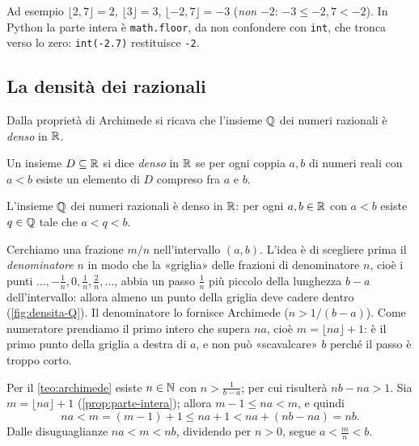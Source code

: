 Ad esempio $\lfloor 2{,}7\rfloor=2$, $\lfloor 3\rfloor=3$, $\lfloor-2{,}7\rfloor=-3$
(\emph{non} $-2$: $-3\le-2{,}7<-2$). In Python la parte intera è
\texttt{math.floor}, da non confondere con \texttt{int}, che tronca verso lo zero:
\texttt{int(-2.7)} restituisce \texttt{-2}.

\subsection{La densità dei razionali}

Dalla proprietà di Archimede si ricava che l'insieme $\mathbb{Q}$ dei numeri razionali è
\emph{denso} in $\mathbb{R}$.

\begin{definizione}
Un insieme $D\subseteq\mathbb{R}$ si dice \emph{denso} in $\mathbb{R}$ se per ogni coppia $a,b$ di numeri
reali con $a<b$ esiste un elemento di $D$ compreso fra $a$ e $b$.
\end{definizione}

\begin{teorema}\label{teo:densita-Q}
L'insieme $\mathbb{Q}$ dei numeri razionali è denso in $\mathbb{R}$: per ogni $a,b\in\mathbb{R}$ con $a<b$
esiste $q\in\mathbb{Q}$ tale che $a<q<b$.
\end{teorema}

\begin{schema}
\end{schema}

\begin{strategia}
Cerchiamo una frazione $m/n$ nell'intervallo $(a,b)$. L'idea è di scegliere prima il
\emph{denominatore} $n$ in modo che la «griglia» delle frazioni di denominatore $n$,
cioè i punti $\dots,-\frac1n,0,\frac1n,\frac2n,\dots$, abbia un passo $\frac1n$ più
piccolo della lunghezza $b-a$ dell'intervallo: allora almeno un punto della griglia deve
cadere dentro (\cref{fig:densita-Q}). Il denominatore lo fornisce Archimede ($n>1/(b-a)$).
Come numeratore prendiamo il primo intero che supera $na$, cioè $m=\lfloor na\rfloor+1$:
è il primo punto della griglia a destra di $a$, e non può «scavalcare» $b$ perché il passo
è troppo corto.
\end{strategia}

\begin{dimostrazione}
Per il \cref{teo:archimede} esiste $n\in\mathbb{N}$ con $n>\frac{1}{b-a}$; per cui risulterà
$nb-na>1$. Sia $m=\lfloor na\rfloor+1$ (\cref{prop:parte-intera}); allora
$m-1\le na<m$, e quindi
\[
  na<m=(m-1)+1\le na+1<na+(nb-na)=nb .
\]
Dalle disuguaglianze $na<m<nb$, dividendo per $n>0$, segue $a<\frac mn<b$.
\end{dimostrazione}

